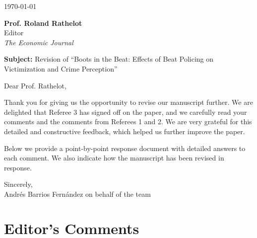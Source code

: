 \documentclass[11pt,english]{article}
\begin{document}


\makeatletter
{\def\@currentlabel{1}\label{introduction}}
{\def\@currentlabel{2}\label{institutions}}
{\def\@currentlabel{3}\label{identification}}
{\def\@currentlabel{1}\label{eq:main}}
{\def\@currentlabel{4}\label{results}}
{\def\@currentlabel{4.1}\label{main_results}}
{\def\@currentlabel{4.2}\label{sec:spillovers}}
{\def\@currentlabel{4.3}\label{heterogeneity}}
{\def\@currentlabel{4.4}\label{mechanisms}}
{\def\@currentlabel{5}\label{conclusions}}
{\def\@currentlabel{A}\label{sec:appendixA}}
{\def\@currentlabel{B}\label{sec:appendixB}}
{\def\@currentlabel{B.4}\label{resources_plan_cuadrante}}
{\def\@currentlabel{C}\label{sec:appendixC}}
{\def\@currentlabel{C.4}\label{sec:admin_uncapped}}
{\def\@currentlabel{C.5}\label{sec:bonferroni}}
{\def\@currentlabel{C.8}\label{sec:earthquake}}
\makeatother

\doublespacing
\begin{flushright}
\today \\[24pt]
\end{flushright}

\vspace{1em}

\noindent \textbf{Prof. Roland Rathelot}\\
Editor \\
\textit{The Economic Journal}

\vspace{0.5em}

\noindent \textbf{Subject:} Revision of ``Boots in the Beat: Effects of Beat Policing on Victimization and Crime Perception''

\vspace{1.5em}

Dear Prof. Rathelot,

Thank you for giving us the opportunity to revise our manuscript further. We are delighted that Referee 3 has signed off on the paper, and we carefully read your comments and the comments from Referees 1 and 2. We are very grateful for this detailed and constructive feedback, which helped us further improve the paper.

Below we provide a point-by-point response document with detailed answers to each comment. We also indicate how the manuscript has been revised in response.

\vspace{1em}

Sincerely,\\[0.5em]

Andr\'es Barrios Fern\'andez on behalf of the team

\clearpage

\section*{Editor's Comments}

\FloatBarrier
\end{document}
